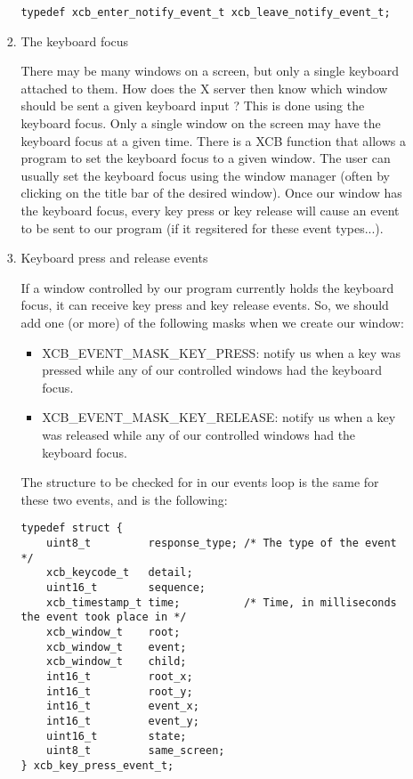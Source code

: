 \documentclass[12pt,oneside,titlepage]{book}
\providecommand{\tightlist}{%
  \setlength{\itemsep}{0pt}\setlength{\parskip}{0pt}}
\begin{document}
\begin{enumerate}
\begin{enumerate}
\begin{enumerate}
\begin{verbatim}
typedef xcb_enter_notify_event_t xcb_leave_notify_event_t;
\end{verbatim}
    \item
      \protect\hypertarget{focus}{}{The keyboard focus}

      There may be many windows on a screen, but only a single keyboard
      attached to them. How does the X server then know which window
      should be sent a given keyboard input ? This is done using the
      keyboard focus. Only a single window on the screen may have the
      keyboard focus at a given time. There is a XCB function that
      allows a program to set the keyboard focus to a given window. The
      user can usually set the keyboard focus using the window manager
      (often by clicking on the title bar of the desired window). Once
      our window has the keyboard focus, every key press or key release
      will cause an event to be sent to our program (if it regsitered
      for these event types...).
    \item
      \protect\hypertarget{keypress}{}{Keyboard press and release
      events}

      If a window controlled by our program currently holds the keyboard
      focus, it can receive key press and key release events. So, we
      should add one (or more) of the following masks when we create our
      window:

      \begin{itemize}
      \tightlist
      \item
        {XCB\_EVENT\_MASK\_KEY\_PRESS}: notify us when a key was pressed
        while any of our controlled windows had the keyboard focus.
      \item
        {XCB\_EVENT\_MASK\_KEY\_RELEASE}: notify us when a key was
        released while any of our controlled windows had the keyboard
        focus.
      \end{itemize}

      The structure to be checked for in our events loop is the same for
      these two events, and is the following:

\begin{verbatim}
typedef struct {
    uint8_t         response_type; /* The type of the event */
    xcb_keycode_t   detail;
    uint16_t        sequence;
    xcb_timestamp_t time;          /* Time, in milliseconds the event took place in */
    xcb_window_t    root;
    xcb_window_t    event;
    xcb_window_t    child;
    int16_t         root_x;
    int16_t         root_y;
    int16_t         event_x;
    int16_t         event_y;
    uint16_t        state;
    uint8_t         same_screen;
} xcb_key_press_event_t;


\end{verbatim}
\end{enumerate}
\end{enumerate}
\end{enumerate}
\end{document}
